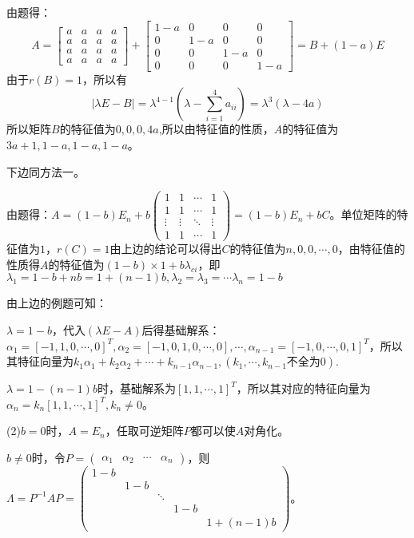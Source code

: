\documentclass[a4paper]{report}
\begin{document}
\begin{tips}
\begin{jie}
由题得：
\begin{equation*}A=
  \begin{bmatrix}
    a & a& a& a \\
    a & a& a& a \\
    a & a& a& a \\
    a & a& a& a
  \end{bmatrix}+
   \begin{bmatrix}
    1-a & 0& 0& 0 \\
    0 & 1-a& 0& 0 \\
    0 & 0& 1-a& 0 \\
    0 & 0& 0& 1-a
  \end{bmatrix}=B+(1-a)E
\end{equation*}
由于$r(B)=1$，所以有
\begin{equation*}
  |\lambda E -B|=\lambda^{4-1}\left(\lambda-\sum\limits_{i=1}^{4}a_{ii}\right)=
  \lambda^{3}\left(\lambda-4a\right)
\end{equation*}
所以矩阵$B$的特征值为$0,0,0,4a$,所以由特征值的性质，$A$的特征值为$3a+1,1-a,1-a,1-a$。

下边同方法一。
\end{jie}
\hphantom{.}
\end{tips}

\begin{jie}
由题得：$A
=
(1-b)E_{n}+b
\begin{pmatrix}
1&1&\cdots&1\\
1&1&\cdots&1\\
\vdots&\vdots&\ddots&\vdots\\
1&1&\cdots&1
\end{pmatrix}=(1-b)E_{n}+bC
$。单位矩阵的特征值为$1$，$r(C)=1$由上边的结论可以得出$C$的特征值为$n,0,0,\cdots,0$，由特征值的性质得$A$的特征值为$(1-b)\times 1+b\lambda_{ci}$，即$\lambda_1=1-b+nb=1+(n-1)b,\lambda_2=\lambda_3=\cdots\lambda_n=1-b$

由上边的例题可知：

$\lambda=1-b$，代入$(\lambda E-A)$后得基础解系：$
\alpha_1=[-1,1,0,\cdots,0]^T,\alpha_2=[-1,0,1,0,\cdots,0],\cdots,\alpha_{n-1}=[-1,0,\cdots,0,1]^T
$，所以其特征向量为$k_1\alpha_1+k_2\alpha_2+\cdots+k_{n-1}\alpha_{n-1},(k_1,\cdots,k_{n-1}\text{不全为0})$.

$\lambda=1-(n-1)b$时，基础解系为$[1,1,\cdots,1]^T$，所以其对应的特征向量为$\alpha_n=k_{n}[1,1,\cdots,1]^T,k_n\neq 0$。

(2)$b=0$时，$A=E_n$，任取可逆矩阵$P$都可以使$A$对角化。

$b\neq 0$时，令$P=
\begin{pmatrix}
\alpha_1&\alpha_2&\cdots&\alpha_n
\end{pmatrix}
$，则$\Lambda=P^{-1}AP=
\begin{pmatrix}
1-b\\
&1-b\\
&&\ddots\\
&&&1-b\\
&&&&1+(n-1)b
\end{pmatrix}
$。
\end{jie}
\end{document}
